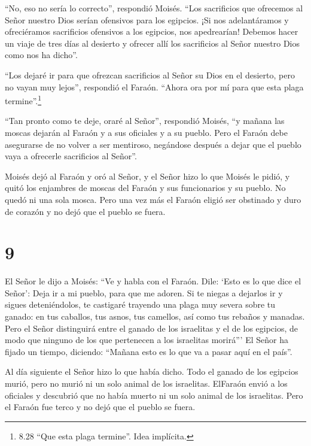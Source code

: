  ``No, eso no sería lo correcto'', respondió Moisés. ``Los
sacrificios que ofrecemos al Señor nuestro Dios serían ofensivos para
los egipcios. ¡Si nos adelantáramos y ofreciéramos sacrificios ofensivos
a los egipcios, nos apedrearían!  Debemos hacer un viaje de
tres días al desierto y ofrecer allí los sacrificios al Señor nuestro
Dios como nos ha dicho''.

 ``Los dejaré ir para que ofrezcan sacrificios al Señor su
Dios en el desierto, pero no vayan muy lejos'', respondió el Faraón.
``Ahora ora por mí para que esta plaga termine''.\footnote{8.28 ``Que
  esta plaga termine''. Idea implícita.}

 ``Tan pronto como te deje, oraré al Señor'', respondió
Moisés, ``y mañana las moscas dejarán al Faraón y a sus oficiales y a su
pueblo. Pero el Faraón debe asegurarse de no volver a ser mentiroso,
negándose después a dejar que el pueblo vaya a ofrecerle sacrificios al
Señor''.

 Moisés dejó al Faraón y oró al Señor,  y el
Señor hizo lo que Moisés le pidió, y quitó los enjambres de moscas del
Faraón y sus funcionarios y su pueblo. No quedó ni una sola mosca.
 Pero una vez más el Faraón eligió ser obstinado y duro de
corazón y no dejó que el pueblo se fuera.

\hypertarget{section-8}{%
\section{9}\label{section-8}}

 El Señor le dijo a Moisés: ``Ve y habla con el Faraón.
Dile: `Esto es lo que dice el Señor': Deja ir a mi pueblo, para que me
adoren.  Si te niegas a dejarlos ir y sigues deteniéndolos,
 te castigaré trayendo una plaga muy severa sobre tu ganado:
en tus caballos, tus asnos, tus camellos, así como tus rebaños y
manadas.  Pero el Señor distinguirá entre el ganado de los
israelitas y el de los egipcios, de modo que ninguno de los que
pertenecen a los israelitas morirá'''  El Señor ha fijado un
tiempo, diciendo: ``Mañana esto es lo que va a pasar aquí en el país''.

 Al día siguiente el Señor hizo lo que había dicho. Todo el
ganado de los egipcios murió, pero no murió ni un solo animal de los
israelitas.  ElFaraón envió a los oficiales y descubrió que
no había muerto ni un solo animal de los israelitas. Pero el Faraón fue
terco y no dejó que el pueblo se fuera.

